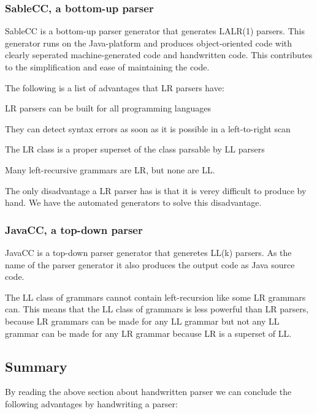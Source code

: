 \subsubsection{SableCC, a bottom-up parser}
\label{sec:ana-sablecc}
SableCC is a bottom-up parser generator that generates LALR(1) parsers. This generator runs on the Java-platform and produces object-oriented code with clearly seperated machine-generated code and handwritten code. This contributes to the simplification and ease of maintaining the code.\cite[pp. 11]{sableccdoc}

The following is a list of advantages that LR parsers have:\cite[pp. 193]{sebesta2013} 

\begin{dlist}
\item LR parsers can be built for all programming languages
\item They can detect syntax errors as soon as it is possible in a left-to-right scan
\item The LR class is a proper superset of the class parsable by LL parsers
\begin{dlist}
\item Many left-recursive grammars are LR, but none are LL.
\end{dlist}
\end{dlist}

The only disadvantage a LR parser has is that it is verey difficult to produce by hand. We have the automated generators to solve this disadvantage.\cite[pp. 193]{sebesta2013}

\subsubsection{JavaCC, a top-down parser}
\label{sec:ana-javacc}
JavaCC is a top-down parser generator that generetes LL(k) parsers. As the name of the parser generator it also produces the output code as Java source code.\cite{wiki-javacc}

The LL class of grammars cannot contain left-recursion like some LR grammars can. This means that the LL class of grammars is less powerful than LR parsers, because LR grammars can be made for any LL grammar but not any LL grammar can be made for any LR grammar because LR is a superset of LL.

\subsection{Summary}
\label{sec:ana-parsersum}
By reading the above section about handwritten parser we can conclude the following advantages by handwriting a parser:

